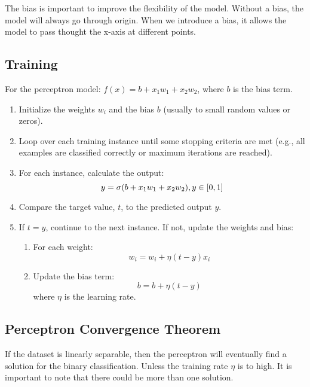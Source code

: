 \documentclass{article}
\begin{document}
    The bias is important to improve the flexibility of the model. 
    Without a bias, the model will always go through origin. 
    When we introduce a bias, it allows the model to pass thought the x-axis at different points. 

    \newpage
    

    \subsection{Training}

    For the perceptron model: $f(x) = b + x_1w_1 + x_2w_2$, where $b$ is the bias term.

    \begin{enumerate}
        \item Initialize the weights $w_i$ and the bias $b$ (usually to small random values or zeros).
        \item Loop over each training instance until some stopping criteria are met (e.g., all examples are classified correctly or maximum iterations are reached).
        \item For each instance, calculate the output: 
        \[
        y = \sigma(b + x_1w_1 + x_2w_2), \newline
        y \in [0, 1]
        \]
        \item Compare the target value, $t$, to the predicted output $y$.
        \item If $t = y$, continue to the next instance. If not, update the weights and bias:
        \begin{enumerate}
            \item For each weight: 
            \[
            w_i = w_i + \eta(t - y)x_i
            \]
            \item Update the bias term:
            \[
            b = b + \eta(t - y)
            \]
            where $\eta$ is the learning rate.
        \end{enumerate}
    \end{enumerate}



    \subsection{Perceptron Convergence Theorem}

    If the dataset is linearly separable, then the perceptron will eventually find a solution for the binary classification.
    Unless the training rate $\eta$ is to high. It is important to note that there could be more than one solution. 
\end{document}

